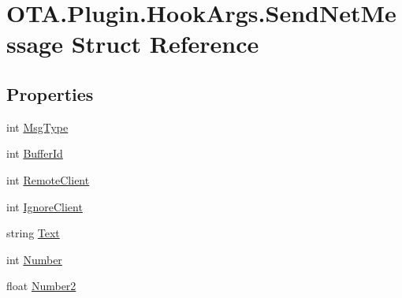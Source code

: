 \hypertarget{struct_o_t_a_1_1_plugin_1_1_hook_args_1_1_send_net_message}{}\section{O\+T\+A.\+Plugin.\+Hook\+Args.\+Send\+Net\+Message Struct Reference}
\label{struct_o_t_a_1_1_plugin_1_1_hook_args_1_1_send_net_message}
\subsection*{Properties}
\begin{DoxyCompactItemize}
\item 
int \hyperlink{struct_o_t_a_1_1_plugin_1_1_hook_args_1_1_send_net_message_a66ae46e7495444da0179f5cb1f9e0812}{Msg\+Type}
\item 
int \hyperlink{struct_o_t_a_1_1_plugin_1_1_hook_args_1_1_send_net_message_a7cf4641bae4db33382857265434f8f77}{Buffer\+Id}
\item 
int \hyperlink{struct_o_t_a_1_1_plugin_1_1_hook_args_1_1_send_net_message_a92225011fe528178d86f4a885ca25d3d}{Remote\+Client}
\item 
int \hyperlink{struct_o_t_a_1_1_plugin_1_1_hook_args_1_1_send_net_message_a3ea5168e9b5da4cc749d9f844373d880}{Ignore\+Client}
\item 
string \hyperlink{struct_o_t_a_1_1_plugin_1_1_hook_args_1_1_send_net_message_a80b3ed7b70c26040098f58e6c332ab44}{Text}
\item 
int \hyperlink{struct_o_t_a_1_1_plugin_1_1_hook_args_1_1_send_net_message_a1e9041c4f497ab34079b76e99aa710d7}{Number}
\item 
float \hyperlink{struct_o_t_a_1_1_plugin_1_1_hook_args_1_1_send_net_message_a8885b7d94f28f1f77fca7e94dad84d3d}{Number2}
\item 

\end{DoxyCompactItemize}
